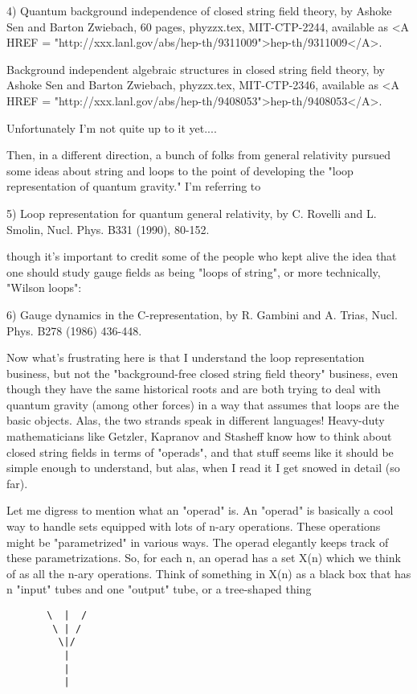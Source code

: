 4)  Quantum background independence of closed string field theory, 
by Ashoke Sen and Barton Zwiebach, 60 pages, phyzzx.tex, MIT-CTP-2244,
available as <A HREF = "http://xxx.lanl.gov/abs/hep-th/9311009">hep-th/9311009</A>.

Background independent algebraic structures in closed string field theory,
by Ashoke Sen and Barton Zwiebach, phyzzx.tex, MIT-CTP-2346, available
as <A HREF = "http://xxx.lanl.gov/abs/hep-th/9408053">hep-th/9408053</A>.  

Unfortunately I'm not quite up to it yet....

Then, in a different direction, a bunch of folks from general relativity
pursued some ideas about string and loops to the point of developing the
"loop representation of quantum gravity."  I'm referring to

5) Loop representation for quantum general relativity, by C. Rovelli
and L. Smolin, Nucl. Phys. B331 (1990), 80-152.

though it's important to credit some of the people who kept alive the idea
that one should study gauge fields as being "loops of string", or more
technically, "Wilson loops":

6) Gauge dynamics in the C-representation, by R. Gambini and A. Trias,
Nucl. Phys. B278 (1986) 436-448. 

Now what's frustrating here is that I understand the loop representation
business, but not the "background-free closed string field theory"
business, even though they have the same historical roots and are both
trying to deal with quantum gravity (among other forces) in a way that
assumes that loops are the basic objects.  Alas, the two strands speak
in different languages!  Heavy-duty mathematicians like Getzler,
Kapranov and Stasheff know how to think about closed string fields in
terms of "operads", and that stuff seems like it should be simple enough
to understand, but alas, when I read it I get snowed in detail (so far).

Let me digress to mention what an "operad" is.  An "operad" is basically
a cool way to handle sets equipped with lots of n-ary operations.  These
operations might be "parametrized" in various ways.  The operad
elegantly keeps track of these parametrizations.  So, for each n, an
operad has a set X(n) which we think of as all the n-ary operations.
Think of something in X(n) as a black box that has n "input" tubes and
one "output" tube, or a tree-shaped thing

\begin{verbatim}
       \  |  /
        \ | /
         \|/
          |
          |
          |
\end{verbatim}
    

